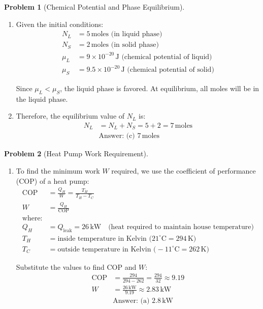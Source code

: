 \documentclass[12pt]{article}
\theoremstyle{definition} %
\newtheorem{problem}{Problem}
\theoremstyle{plain} %
\begin{document}
\begin{problem}[Chemical Potential and Phase Equilibrium]
    \noindent
    \begin{enumerate}
        \item 
        Given the initial conditions:
        \begin{align*}
        N_L &= 5 \, \text{moles (in liquid phase)} \\
        N_S &= 2 \, \text{moles (in solid phase)} \\
        \mu_L &= 9 \times 10^{-20} \, \text{J (chemical potential of liquid)} \\
        \mu_S &= 9.5 \times 10^{-20} \, \text{J (chemical potential of solid)}
        \end{align*}
        
        Since \( \mu_L < \mu_S \), the liquid phase is favored. At equilibrium, all moles will be in the liquid phase.

        \item 
        Therefore, the equilibrium value of \( N_L \) is:
        \begin{align*}
        N_L &= N_L + N_S = 5 + 2 = 7 \, \text{moles} \\
        &\text{Answer: (c) } 7 \, \text{moles}
        \end{align*}
    \end{enumerate}
\end{problem}
\begin{problem}[Heat Pump Work Requirement]
    \noindent
    \begin{enumerate}
        \item 
        To find the minimum work \( W \) required, we use the coefficient of performance (COP) of a heat pump:
        \begin{align*}
        \text{COP} &= \frac{Q_H}{W} = \frac{T_H}{T_H - T_C} \\
        W &= \frac{Q_H}{\text{COP}} \\
        \text{where:} \\
        Q_H &= Q_{\text{leak}} = 26 \, \text{kW} \quad \text{(heat required to maintain house temperature)} \\
        T_H &= \text{inside temperature in Kelvin (} 21^\circ \text{C} = 294 \, \text{K)} \\
        T_C &= \text{outside temperature in Kelvin (} -11^\circ \text{C} = 262 \, \text{K)}
        \end{align*}

        Substitute the values to find \( \text{COP} \) and \( W \):
        \begin{align*}
        \text{COP} &= \frac{294}{294 - 262} = \frac{294}{32} \approx 9.19 \\
        W &= \frac{26 \, \text{kW}}{9.19} \approx 2.83 \, \text{kW} \\
        &\text{Answer: (a) } 2.8 \, \text{kW}
        \end{align*}
    \end{enumerate}
\end{problem}
\end{document}
